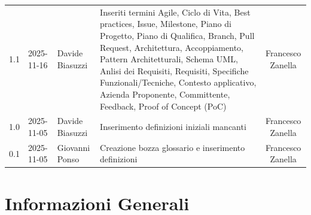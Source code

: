 \documentclass[a4paper, 11pt, oneside]{scrartcl} %
\begin{document}
\begin{center}
{\begin{tabular}{@{}llp{}p{}c@{}}
            1.1                                                                                                                                                            & 2025-11-16      & Davide Biasuzzi   & Inseriti termini Agile, Ciclo di Vita, Best practices, Issue, Milestone, Piano di Progetto, Piano di Qualifica, Branch, Pull Request, Architettura, Accoppiamento, Pattern Architetturali, Schema UML, Anlisi dei Requisiti, Requisiti, Specifiche Funzionali/Tecniche, Contesto applicativo, Azienda Proponente, Committente, Feedback, Proof of Concept (PoC)                                                                          & Francesco Zanella     \\
            1.0                                                                                                                                                            & 2025-11-05      & Davide Biasuzzi   & Inserimento definizioni iniziali mancanti                                                                                                                                                                                                                                                                                                                                                                                                & Francesco Zanella     \\
            0.1                                                                                                                                                            & 2025-11-05      & Giovanni Ponso    & Creazione bozza glossario e inserimento definizioni                                                                                                                                                                                                                                                                                                                                                                                      & Francesco Zanella     \\
            \bottomrule
        \end{tabular}
    }
\end{center}


\newpage
\tableofcontents %
\pagestyle{fancy}

\newpage
\section{Informazioni Generali}
\end{document}
